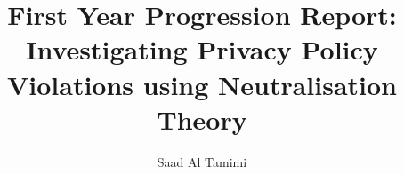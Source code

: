 \documentclass[10pt,a4paper]{article}
\begin{document}
	
	\title{\textbf{First Year Progression Report: Investigating Privacy Policy Violations using Neutralisation Theory}}
	
	\author{Saad Al Tamimi}
	
	\maketitle
\end{document}
